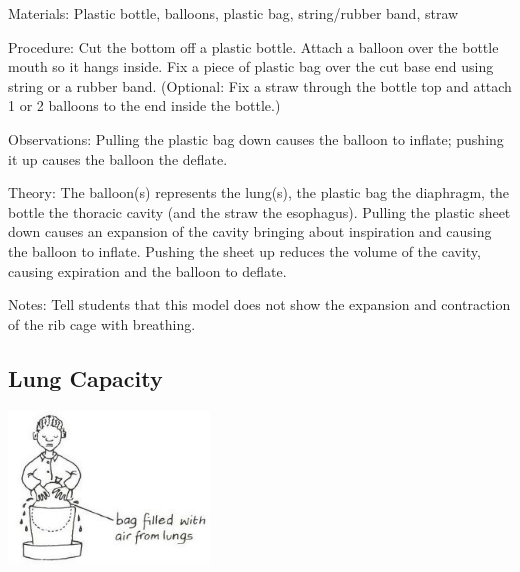 \begin{multicols}{2}
\begin{description*}
\item[Materials:]{Plastic bottle, balloons, plastic bag, string/rubber band, straw}
\item[Procedure:]{Cut the bottom off a plastic
bottle. Attach a balloon over the
bottle mouth so it hangs inside.
Fix a piece of plastic bag over the
cut base end using string or a rubber band. (Optional: Fix a straw through the bottle top and attach 1 or 2 balloons to the end inside the bottle.)}
\item[Observations:]{Pulling the plastic bag down causes the balloon to inflate; pushing it up causes the balloon the deflate.}
\item[Theory:]{The balloon(s) represents the lung(s), the plastic bag the diaphragm, the bottle the thoracic cavity (and the straw the esophagus). Pulling the plastic sheet down causes an expansion of the cavity bringing about inspiration and causing the balloon to inflate. Pushing the sheet up reduces the volume of the cavity, causing expiration and the balloon to deflate.}
\item[Notes:]{Tell students that this model does not show the expansion and contraction of the rib cage with breathing.}
\end{description*}

\subsection{Lung Capacity}

\begin{center}
\includegraphics[width=0.4\textwidth]{./img/vso/lung-capacity.jpg}
\end{center}


\end{multicols}
